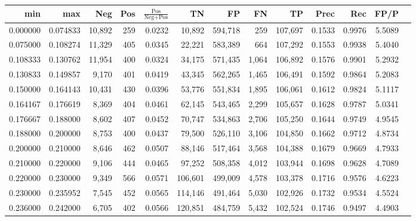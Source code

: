\begin{tabular}{rrrrrrrrrrrrr}
\toprule
     min &      max &    Neg &   Pos & $\frac{\text{Pos}}{\text{Neg}+\text{Pos}}$ &      TN &      FP &      FN &      TP &   Prec &    Rec &   FP/P \\
\midrule
0.000000 & 0.074833 & 10,892 &   259 &                                     0.0232 &  10,892 & 594,718 &     259 & 107,697 & 0.1533 & 0.9976 & 5.5089 \\
0.075000 & 0.108274 & 11,329 &   405 &                                     0.0345 &  22,221 & 583,389 &     664 & 107,292 & 0.1553 & 0.9938 & 5.4040 \\
0.108333 & 0.130762 & 11,954 &   400 &                                     0.0324 &  34,175 & 571,435 &   1,064 & 106,892 & 0.1576 & 0.9901 & 5.2932 \\
0.130833 & 0.149857 &  9,170 &   401 &                                     0.0419 &  43,345 & 562,265 &   1,465 & 106,491 & 0.1592 & 0.9864 & 5.2083 \\
0.150000 & 0.164143 & 10,431 &   430 &                                     0.0396 &  53,776 & 551,834 &   1,895 & 106,061 & 0.1612 & 0.9824 & 5.1117 \\
0.164167 & 0.176619 &  8,369 &   404 &                                     0.0461 &  62,145 & 543,465 &   2,299 & 105,657 & 0.1628 & 0.9787 & 5.0341 \\
0.176667 & 0.188000 &  8,602 &   407 &                                     0.0452 &  70,747 & 534,863 &   2,706 & 105,250 & 0.1644 & 0.9749 & 4.9545 \\
0.188000 & 0.200000 &  8,753 &   400 &                                     0.0437 &  79,500 & 526,110 &   3,106 & 104,850 & 0.1662 & 0.9712 & 4.8734 \\
0.200000 & 0.210000 &  8,646 &   462 &                                     0.0507 &  88,146 & 517,464 &   3,568 & 104,388 & 0.1679 & 0.9669 & 4.7933 \\
0.210000 & 0.220000 &  9,106 &   444 &                                     0.0465 &  97,252 & 508,358 &   4,012 & 103,944 & 0.1698 & 0.9628 & 4.7089 \\
0.220000 & 0.230000 &  9,349 &   566 &                                     0.0571 & 106,601 & 499,009 &   4,578 & 103,378 & 0.1716 & 0.9576 & 4.6223 \\
0.230000 & 0.235952 &  7,545 &   452 &                                     0.0565 & 114,146 & 491,464 &   5,030 & 102,926 & 0.1732 & 0.9534 & 4.5524 \\
0.236000 & 0.242000 &  6,705 &   402 &                                     0.0566 & 120,851 & 484,759 &   5,432 & 102,524 & 0.1746 & 0.9497 & 4.4903 \\

\end{tabular}
